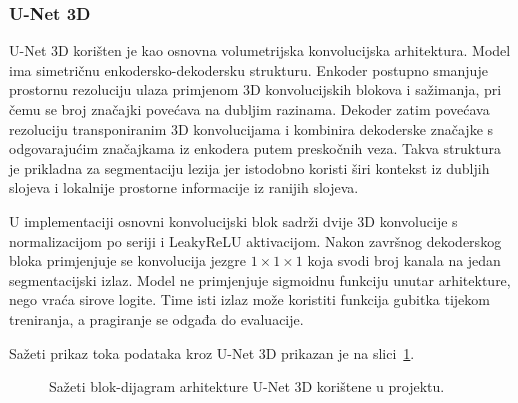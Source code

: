 \documentclass[a4paper,12pt,oneside]{article}
\begin{document}

\subsubsection{U-Net 3D}

U-Net 3D korišten je kao osnovna volumetrijska konvolucijska arhitektura. Model ima simetričnu enkodersko-dekodersku strukturu. Enkoder postupno smanjuje prostornu rezoluciju ulaza primjenom 3D konvolucijskih blokova i sažimanja, pri čemu se broj značajki povećava na dubljim razinama. Dekoder zatim povećava rezoluciju transponiranim 3D konvolucijama i kombinira dekoderske značajke s odgovarajućim značajkama iz enkodera putem preskočnih veza. Takva struktura je prikladna za segmentaciju lezija jer istodobno koristi širi kontekst iz dubljih slojeva i lokalnije prostorne informacije iz ranijih slojeva.

U implementaciji osnovni konvolucijski blok sadrži dvije 3D konvolucije s normalizacijom po seriji i LeakyReLU aktivacijom. Nakon završnog dekoderskog bloka primjenjuje se konvolucija jezgre $1 \times 1 \times 1$ koja svodi broj kanala na jedan segmentacijski izlaz. Model ne primjenjuje sigmoidnu funkciju unutar arhitekture, nego vraća sirove logite. Time isti izlaz može koristiti funkcija gubitka tijekom treniranja, a pragiranje se odgađa do evaluacije.

Sažeti prikaz toka podataka kroz U-Net 3D prikazan je na slici~\ref{fig:unet3d_arch}.

\begin{figure}[H]
\centering
{}
\caption{Sažeti blok-dijagram arhitekture U-Net 3D korištene u projektu. \label{fig:unet3d_arch}}
\end{figure}
\end{document}
